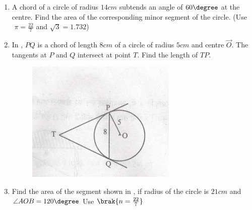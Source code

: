 \begin{enumerate}
\item A chord of a circle of radius $14 cm$ subtends an angle of $60\degree$ at the centre. Find the area of the corresponding minor segment of the circle.
({Use $\hspace{4pt}\pi=\frac{22}{7}$ and $\sqrt{3} = 1.732$})
\item In , $PQ$ is a chord of length $8 cm$ of a circle of radius $5 cm$ and centre $\vec{O}$. The tangents at $P$ and $Q$ intersect at point $T$. Find the length of $TP$.
\begin{figure}[H]                                             \centering
         \includegraphics[width=\columnwidth]{figs/i2.jpeg}
			\caption{}
			\label{fig:circles_456}

                \end{figure}
\item Find the area of the segment shown in , if radius of the circle is $21 cm$ and $\angle AOB = 120\degree$ Use $\brak{n =\frac{22}{7}} $
\begin{figure}[H]                                     
\centering
	

\end{figure}
\end{enumerate}
